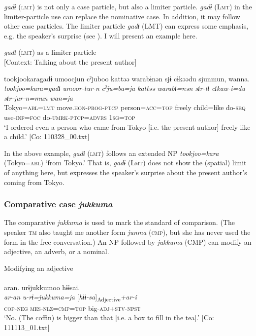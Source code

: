 \textit{gadɨ} (\textsc{lmt}) is not only a case particle, but also a limiter particle. \textit{gadɨ} (L\textsc{mt}) in the limiter-particle use can replace the nominative case. In addition, it may follow other case particles. The limiter particle \textit{gadɨ} (LMT) can express some emphasis, e.g. the speaker’s surprise (see ). I will present an example here.

\ea\label{ex:6-77}
  \textit{gadɨ} (\textsc{lmt}) as a limiter particle\\
  {}[Context: Talking about the present author]

{\TM}
\glll tookjookaragadɨ  umoocjun  cˀjuboo  kattəə   warabɨnən  sjɨ  cɨkəədu  sjunmun,  wanna.\\
\textit{tookjoo=kara=gadɨ}  \textit{umoor-tur-n}  \textit{cˀju=ba=ja}  \textit{kattəə} \textit{warabɨ=nən}  \textit{sɨr-tɨ}  \textit{cɨkaw-i=du}  \textit{sɨr-jur-n=mun}  \textit{wan=ja}\\
    Tokyo=\textsc{abl}=\textsc{lmt}  move.\textsc{hon}-\textsc{prog}-\textsc{ptcp}  person=\textsc{acc}=\textsc{top}  freely child=like  do-\textsc{seq}  use-\textsc{inf}=\textsc{foc}  do-\textsc{umrk}-\textsc{ptcp}=\textsc{advrs}  1\textsc{sg}=\textsc{top}\\
\glt    ‘I ordered even a person who came from Tokyo [i.e. the present author] freely like a child.’ [Co: 110328\_00.txt]
\z

In the above example, \textit{gadɨ} (\textsc{lmt}) follows an extended NP \textit{tookjoo=kara} (Tokyo=\textsc{abl}) ‘from Tokyo.’ That is, \textit{gadɨ} (L\textsc{mt}) does not show the (spatial) limit of anything here, but expresses the speaker’s surprise about the present author’s coming from Tokyo.

\subsubsection{Comparative case \textit{jukkuma}}

The comparative \textit{jukkuma} is used to mark the standard of comparison. (The speaker \textsc{tm} also taught me another form \textit{junma} (\textsc{cmp}), but she has never used the form in the free conversation.) An NP followed by \textit{jukkuma} (CMP) can modify an adjective, an adverb, or a nominal.

\ea\label{ex:6-78}
  Modifying an adjective\\
 \ea{}\\
{\TM}
\glll  aran.  urɨjukkumoo  hɨɨsai.\\
\textit{ar-an}  \textit{u-rɨ=jukkuma=ja}  [\textit{hɨɨ-sa}]\textsubscript{Adjective}\textit{+ar-i}\\
\textsc{cop}-\textsc{neg}  \textsc{mes}-\textsc{nlz}=\textsc{cmp}=\textsc{top}  big-\textsc{adj}+\textsc{stv}-\textsc{npst}\\
\glt ‘No. (The coffin) is bigger than that [i.e. a box to fill in the tea].’ [Co: 111113\_01.txt]

